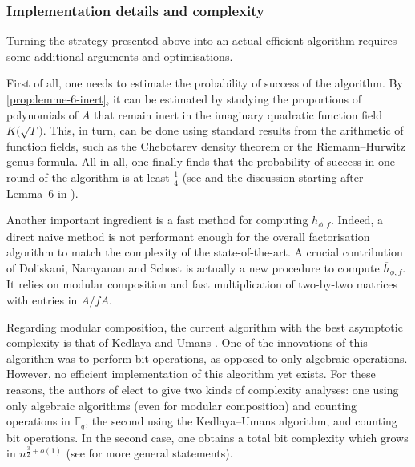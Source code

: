 \documentclass[11pt]{article}
\theoremstyle{definition}
\newcommand\Fq{\mathbb{F}_q}
\begin{document}
\subsubsection{Implementation details and complexity}
\label{ssec:facto:implementation}

Turning the strategy presented above into an actual efficient algorithm requires some additional arguments and optimisations.

First of all, one needs to estimate the probability of success of the
algorithm. By \cref{prop:lemme-6-inert}, it can be estimated by studying
the proportions of polynomials of $A$ that remain inert in the imaginary 
quadratic function field $K\big(\sqrt T\big)$. This, in turn, can be done 
using standard results from the arithmetic of function fields, such as the 
Chebotarev density theorem or the Riemann--Hurwitz genus formula.
All in all, one finally finds that the probability of success in one round
of the algorithm is at least $\frac 1 4$ (see \cite[Lemma~8]{doliskani_drinfeld_2021} and the
discussion starting after Lemma~6 in \cite{doliskani_drinfeld_2021}).

Another important ingredient is a fast method for computing
$\overline{h}_{\phi, f}$. Indeed, a direct naive method is not performant
enough for the overall factorisation algorithm to match the complexity 
of the state-of-the-art. A crucial contribution of Doliskani, Narayanan
and Schost is actually a new procedure to compute $\overline{h}_{\phi, f}$. It
relies on modular composition and fast multiplication of two-by-two matrices
with entries in $A/fA$.

Regarding modular composition, the current algorithm with the best asymptotic complexity is that of Kedlaya and Umans \cite{kedlaya_fast_2011}.
One of the innovations of this algorithm was to perform bit operations, as
opposed to only algebraic operations. 
However, no efficient implementation of this algorithm yet exists.
For these reasons, the authors of \cite{doliskani_drinfeld_2021} elect to give two kinds of complexity analyses: one using only algebraic algorithms (even for modular composition) and counting
operations in $\Fq$, the second using the Kedlaya--Umans algorithm, and counting
bit operations. In the second case, one obtains a total bit complexity which grows
in $n^{\frac 3 2 + o(1)}$ (see \cite[Theorem~2]{doliskani_drinfeld_2021} for more general statements).
\end{document}
